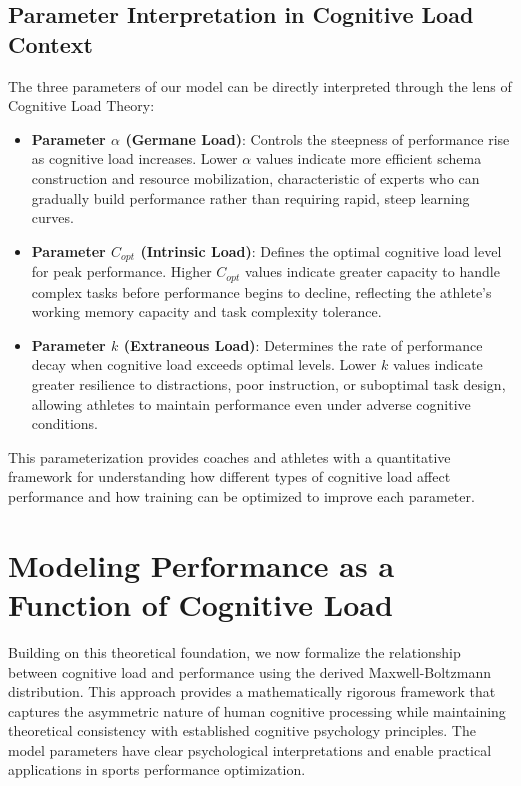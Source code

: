 \documentclass{article}
\begin{document}
\subsection*{Parameter Interpretation in Cognitive Load Context}

The three parameters of our model can be directly interpreted through the lens of Cognitive Load Theory:

\begin{itemize}
    \item \textbf{Parameter $\alpha$ (Germane Load)}: Controls the steepness of performance rise as cognitive load increases.  Lower $\alpha$ values indicate more efficient schema construction and resource mobilization, characteristic of experts who can gradually build performance rather than requiring rapid, steep learning curves.
    
    \item \textbf{Parameter $C_{opt}$ (Intrinsic Load)}: Defines the optimal cognitive load level for peak performance.  Higher $C_{opt}$ values indicate greater capacity to handle complex tasks before performance begins to decline, reflecting the athlete's working memory capacity and task complexity tolerance.
    
    \item \textbf{Parameter $k$ (Extraneous Load)}: Determines the rate of performance decay when cognitive load exceeds optimal levels.  Lower $k$ values indicate greater resilience to distractions, poor instruction, or suboptimal task design, allowing athletes to maintain performance even under adverse cognitive conditions.
\end{itemize}

This parameterization provides coaches and athletes with a quantitative framework for understanding how different types of cognitive load affect performance and how training can be optimized to improve each parameter.



\section*{Modeling Performance as a Function of Cognitive Load}

Building on this theoretical foundation, we now formalize the relationship between cognitive load and performance 
using the derived Maxwell-Boltzmann distribution. This approach provides a mathematically rigorous framework that 
captures the asymmetric nature of human cognitive processing while maintaining theoretical consistency with 
established cognitive psychology principles. The model parameters have clear psychological interpretations and enable 
practical applications in sports performance optimization.
\end{document}
